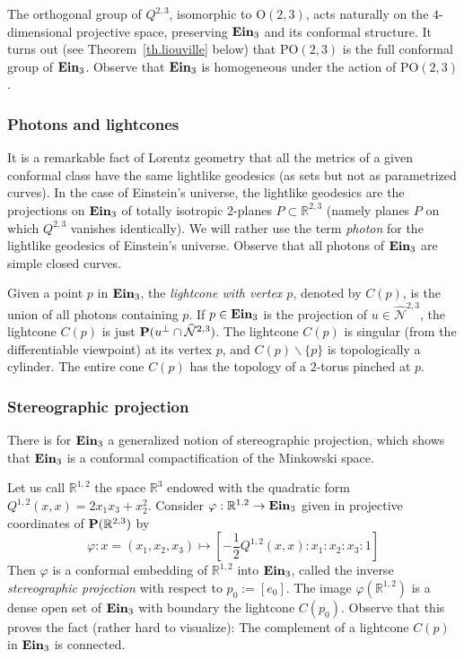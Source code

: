 \documentclass[11pt]{article}
\theoremstyle{definition}
\numberwithin{equation}{section}
\numberwithin{figure}{section}
\numberwithin{table}{section}
\DeclareMathOperator{\ein}{{\bf Ein}_3}
\newcommand*\RR{\mathbb{R}}
\newcommand{\BP}{{\bf P}}
\begin{document}
The orthogonal group of $Q^{2,3}$, isomorphic to $\mbox{O}(2,3)$, acts naturally on the $4$-dimensional projective space, preserving $\ein$ and its conformal structure. It turns out (see Theorem~\ref{th.liouville} below) that $\mbox{PO}(2,3)$ is the full conformal group of $\ein$. Observe that $\ein$ is homogeneous under the action of $\mbox{PO}(2,3)$.

\subsubsection{Photons and lightcones}
It is a remarkable fact of Lorentz geometry that all the metrics of a given conformal class have the same lightlike geodesics (as sets but not as parametrized curves). In the case of Einstein's universe, the lightlike geodesics are the projections on $\ein$ of totally isotropic 2-planes $P \subset \RR^{2,3}$ (namely planes $P$ on which $Q^{2,3}$ vanishes identically). We will rather use the term \emph{photon} for the lightlike geodesics of Einstein's universe. Observe that all photons of $\ein$ are simple closed curves.

Given a point $p$ in $\ein$, the \emph{lightcone with vertex $p$}, denoted by $C(p)$, is the union of all photons containing $p$. If $p \in \ein$ is the projection of $u \in \mathcal{\widehat{N}}^{2,3}$, the lightcone $C(p)$ is just $\BP({ u}^{\bot} \cap \mathcal{\widehat{N}}^{2,3})$. The lightcone $C(p)$ is singular (from the differentiable viewpoint) at its vertex $p$, and $C(p) \backslash \{p \}$ is topologically a cylinder. The entire cone $C(p)$ has the topology of a $2$-torus pinched at $p$.


\subsubsection{Stereographic projection}\label{sec.stereographic}
There is for $\ein$ a generalized notion of stereographic projection, which shows that $\ein$ is a conformal compactification of the Minkowski space.


Let us call $\RR^{1,2}$ the space $\RR^3$ endowed with the quadratic form $Q^{1,2}(x,x)=2x_1x_3+x_2^2$. Consider $\varphi : \RR^{1,2} \to \ein$ given in projective coordinates of $\BP(\RR^{2,3})$ by
\begin{equation}\label{eq.stereographic}
\varphi: x=(x_1,x_2,x_3) \mapsto \left[-\frac{1}{2}Q^{1,2}(x,x): x_1 : x_2 : x_3 : 1\right]
\end{equation}
Then $\varphi$ is a conformal embedding of $\RR^{1,2}$ into $\ein$, called the inverse \emph{stereographic projection } with respect to $p_0:=[e_0]$. The image $\varphi(\RR^{1,2})$ is a dense open set of $\ein$ with boundary the lightcone $C(p_0)$. Observe that this proves the fact (rather hard to visualize): The complement of a lightcone $C(p)$ in $\ein$ is connected.
\end{document}
